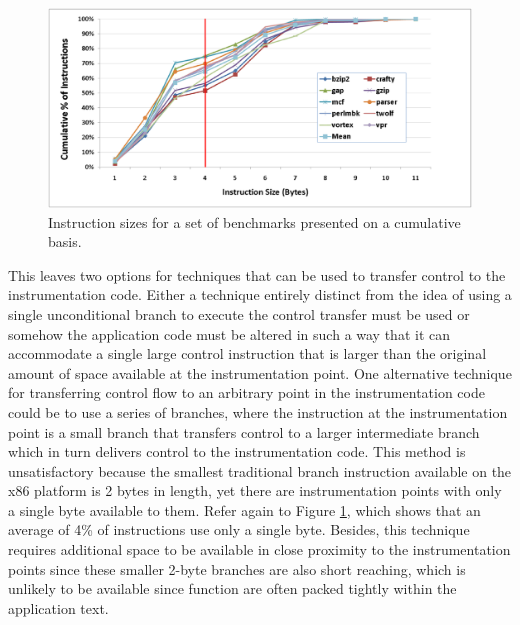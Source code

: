 \begin{figure}[ht]
\centering
\label{fig:InstructionSizes}
\includegraphics[scale=0.4]{instsize.eps}
\caption{Instruction sizes for a set of benchmarks presented on a cumulative basis.}
\end{figure}

This leaves two options for techniques that can be used to transfer control to
the instrumentation code. Either a technique entirely distinct from the idea of
using a single unconditional branch to execute the control transfer must be used
or somehow the application code must be altered in such a way that it can
accommodate a single large control instruction that is larger than the original
amount of space available at the instrumentation point. One alternative
technique for transferring control flow to an arbitrary point in the
instrumentation code could be to use a series of branches, where the instruction
at the instrumentation point is a small branch that transfers control to a
larger intermediate branch which in turn delivers control to the instrumentation
code. This method is unsatisfactory because the smallest traditional branch
instruction available on the x86 platform is 2 bytes in length, yet there are
instrumentation points with only a single byte available to them. Refer again to
Figure \ref{fig:InstructionSizes}, which shows that an average of 4\% of
instructions use only a single byte. Besides, this technique requires additional
space to be available in close proximity to the instrumentation points since
these smaller 2-byte branches are also short reaching, which is unlikely to be
available since function are often packed tightly within the application text.

